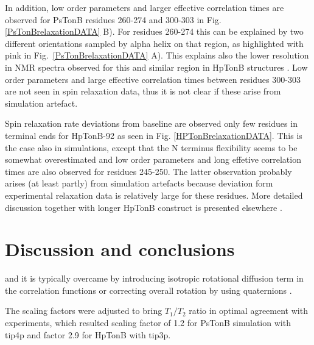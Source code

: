 \documentclass[pre,aps,floatfix,authordate1-4,twocolumn]{revtex4-1}
\begin{document}
In addition, low order parameters and larger effective correlation times
are observed for PsTonB residues 260-274 and 300-303
in Fig. \ref{PsTonBrelaxationDATA} B).
For residues 260-274 this can be explained by two different orientations
sampled by alpha helix on that region, as highlighted with pink
in Fig.~\ref{PsTonBrelaxationDATA} A). This explains also the
lower resolution in NMR spectra observed for this and similar region in
HpTonB structures \cite{??}. Low order parameters and large
effective correlation times between residues 300-303 are not seen
in spin relaxation data, thus it is not clear if these arise from
simulation artefact.

Spin relaxation rate deviations from baseline are observed only few residues in
terminal ends for HpTonB-92 as seen in Fig. \ref{HPTonBrelaxationDATA}.
This is the case also in simulations, except that
the N terminus flexibility seems to be somewhat overestimated and 
low order parameters and long effetive correlation times are also observed
for residues 245-250. The latter observation probably arises
(at least partly) from simulation artefacts because deviation form experimental
relaxation data is relatively large for these residues.
More detailed discussion together with longer HpTonB construct is
presented elsewhere \cite{??}.

\section{Discussion and conclusions}

 and it is typically
overcame by introducing isotropic rotational diffusion term in the correlation
functions \cite{??} or correcting overall rotation by using quaternions \cite{andersson12}.

The scaling factors were adjusted to bring $T_1/T_2$ ratio in optimal
agreement with experiments, which resulted scaling factor of 1.2 for
PsTonB simulation with tip4p and factor 2.9 for HpTonB with tip3p.
\end{document}

